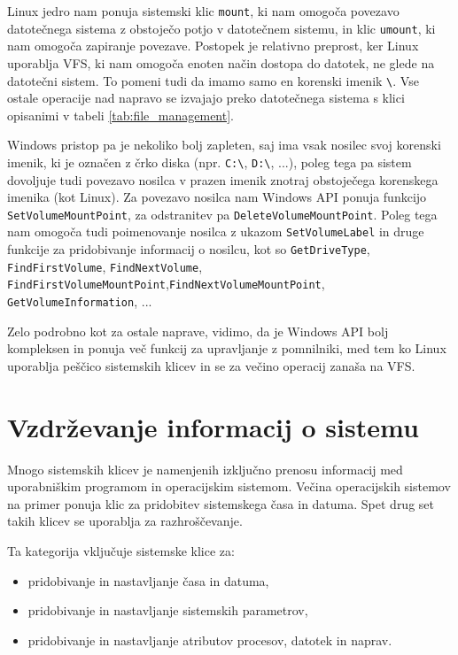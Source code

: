 \documentclass[a4paper,12pt,openright]{book}
\begin{document}
Linux jedro nam ponuja sistemski klic \verb|mount|, ki nam omogoča povezavo datotečnega sistema z obstoječo potjo v datotečnem sistemu, in klic \verb|umount|, ki nam omogoča zapiranje povezave.
Postopek je relativno preprost, ker Linux uporablja VFS, ki nam omogoča enoten način dostopa do datotek, ne glede na datotečni sistem. To pomeni tudi da imamo samo en korenski imenik \verb|\|.
Vse ostale operacije nad napravo se izvajajo preko datotečnega sistema s klici opisanimi v tabeli \ref{tab:file_management}.

Windows pristop pa je nekoliko bolj zapleten, saj ima vsak nosilec svoj korenski imenik, ki je označen z črko diska (npr. \verb|C:\|, \verb|D:\|, ...), poleg tega pa sistem dovoljuje tudi povezavo nosilca v prazen imenik znotraj obstoječega korenskega imenika (kot Linux).
Za povezavo nosilca nam Windows API ponuja funkcijo \verb|SetVolumeMountPoint|, za odstranitev pa \verb|DeleteVolumeMountPoint|.
Poleg tega nam omogoča tudi poimenovanje nosilca z ukazom \verb|SetVolumeLabel| in druge funkcije za pridobivanje informacij o nosilcu, kot so \verb|GetDriveType|, \verb|FindFirstVolume|, \verb|FindNextVolume|, \verb|FindFirstVolumeMountPoint|,\newline\verb|FindNextVolumeMountPoint|, \verb|GetVolumeInformation|, ...

Zelo podrobno kot za ostale naprave, vidimo, da je Windows API bolj kompleksen in ponuja več funkcij za upravljanje z pomnilniki, med tem ko Linux uporablja peščico sistemskih klicev in se za večino operacij zanaša na VFS.

\section{Vzdrževanje informacij o sistemu}

Mnogo sistemskih klicev je namenjenih izključno prenosu informacij med uporabniškim programom in operacijskim sistemom.
Večina operacijskih sistemov na primer ponuja klic za pridobitev sistemskega časa in datuma.
Spet drug set takih klicev se uporablja za razhroščevanje.

Ta kategorija vključuje sistemske klice za:
\begin{itemize}
	\item pridobivanje in nastavljanje časa in datuma,
	\item pridobivanje in nastavljanje sistemskih parametrov,
	\item pridobivanje in nastavljanje atributov procesov, datotek in naprav. \cite{Silberschatz_Galvin_Gagne_2018}
\end{itemize}
\end{document}
